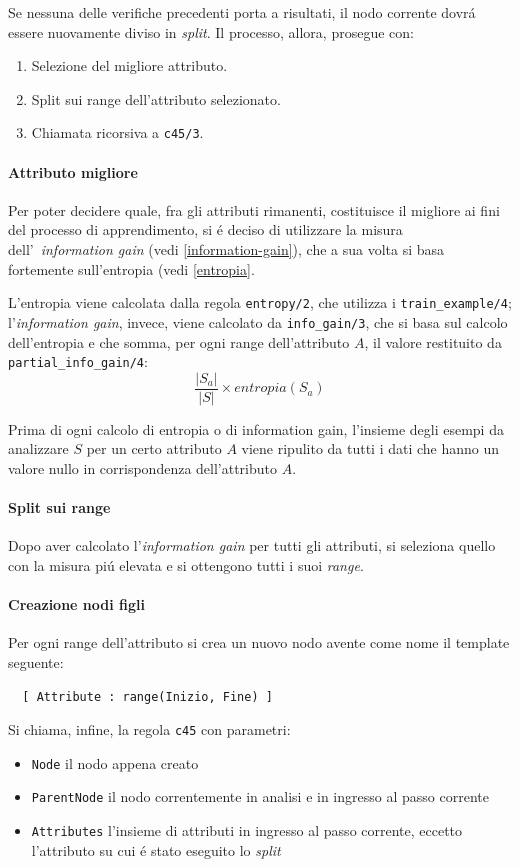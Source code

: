 \documentclass[preprint]{acm_proc_article-sp}
\begin{document}
Se nessuna delle verifiche precedenti porta a risultati, il nodo corrente dovr\'a essere nuovamente diviso in \textit{split}. Il processo, allora, prosegue con:
\begin{enumerate}
\item Selezione del migliore attributo.
\item Split sui range dell'attributo selezionato.
\item Chiamata ricorsiva a \verb|c45/3|.
\end{enumerate}

\paragraph{Attributo migliore}
\label{apprendimento-attributo-migliore}
Per poter decidere quale, fra gli attributi rimanenti, costituisce il migliore ai fini del processo di apprendimento, si \'e deciso di utilizzare la misura dell'~\textit{information gain} (vedi \ref{information-gain}), che a sua volta si basa fortemente sull'entropia (vedi \ref{entropia}.

L'entropia viene calcolata dalla regola \verb|entropy/2|, che utilizza i \verb|train_example/4|; l'\textit{information gain}, invece, viene calcolato da \verb|info_gain/3|, che si basa sul calcolo dell'entropia e che somma, per ogni range dell'attributo $A$, il valore restituito da \verb|partial_info_gain/4|:
\[\frac{|S_a|}{|S|} \times entropia(S_a)\]

Prima di ogni calcolo di entropia o di information gain, l'insieme degli esempi da analizzare $S$ per un certo attributo $A$ viene ripulito da tutti i dati che hanno un valore nullo in corrispondenza dell'attributo $A$.

\paragraph{Split sui range}
Dopo aver calcolato l'\textit{information gain} per tutti gli attributi, si seleziona quello con la misura pi\'u elevata e si ottengono tutti i suoi \textit{range}.

\paragraph{Creazione nodi figli}
Per ogni range dell'attributo si crea un nuovo nodo avente come nome il template seguente:
\begin{verbatim}
  [ Attribute : range(Inizio, Fine) ]
\end{verbatim}
Si chiama, infine, la regola \verb|c45| con parametri:
\begin{itemize}
\item \verb|Node| il nodo appena creato
\item \verb|ParentNode| il nodo correntemente in analisi e in ingresso al passo corrente
\item \verb|Attributes| l'insieme di attributi in ingresso al passo corrente, eccetto l'attributo su cui \'e stato eseguito lo \textit{split}
\end{itemize}
\end{document}
